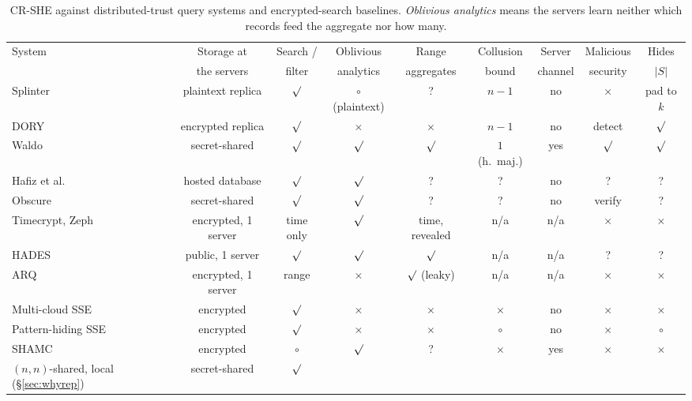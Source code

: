 \documentclass[a4paper,fleqn]{cas-sc}
\providecommand{\checkmark}{\ensuremath{\surd}}
\begin{document}
\begin{table}[pos=t,width=\textwidth]
\caption{CR-SHE against distributed-trust query systems and encrypted-search
baselines. \emph{Oblivious analytics} means the servers learn neither which
records feed the aggregate nor how many.}
\label{tab:compare}
\centering
\scriptsize
\setlength{\tabcolsep}{3pt}
\begin{tabular*}{\tblwidth}{@{\extracolsep{\fill}}lcccccccc@{}}
\toprule
System & Storage at & Search / & Oblivious & Range & Collusion & Server &
Malicious & Hides \\
 & the servers & filter & analytics & aggregates & bound & channel & security &
$|S|$ \\
\midrule
Splinter \citep{splinter} & plaintext replica & $\checkmark$ &
$\circ$ (plaintext) & ? & $n-1$ & no & $\times$ & pad to $k$ \\
DORY \citep{dory} & encrypted replica & $\checkmark$ & $\times$ & $\times$ &
$n-1$ & no & detect & $\checkmark$ \\
Waldo \citep{waldo} & secret-shared & $\checkmark$ & $\checkmark$ &
$\checkmark$ & $1$ (h.\ maj.) & yes & $\checkmark$ & $\checkmark$ \\
Hafiz et al.\ \citep{hafiz2024private} & hosted database & $\checkmark$ &
$\checkmark$ & ? & ? & no & ? & ? \\
Obscure \citep{gupta2020obscure} & secret-shared & $\checkmark$ & $\checkmark$
& ? & ? & no & verify & ? \\
Timecrypt, Zeph \citep{timecrypt,zeph} & encrypted, 1 server & time only &
$\checkmark$ & time, revealed & n/a & n/a & $\times$ & $\times$ \\
HADES \citep{liu2025hades} & public, 1 server & $\checkmark$ & $\checkmark$ &
$\checkmark$ & n/a & n/a & ? & ? \\
ARQ \citep{espiritu2022arq} & encrypted, 1 server & range & $\times$ &
$\checkmark$ (leaky) & n/a & n/a & $\times$ & $\times$ \\
Multi-cloud SSE \citep{xu2021privacy} & encrypted & $\checkmark$ & $\times$ &
$\times$ & $\times$ & no & $\times$ & $\times$ \\
Pattern-hiding SSE \citep{xu2023symmetric} & encrypted & $\checkmark$ &
$\times$ & $\times$ & $\circ$ & no & $\times$ & $\circ$ \\
SHAMC \citep{wang2020shamc} & encrypted & $\circ$ & $\checkmark$ & ? &
$\times$ & yes & $\times$ & $\times$ \\
\midrule
$(n,n)$-shared, local (\S\ref{sec:whyrep}) & secret-shared & $\checkmark$ &

\end{tabular*}
\end{table}
\end{document}
